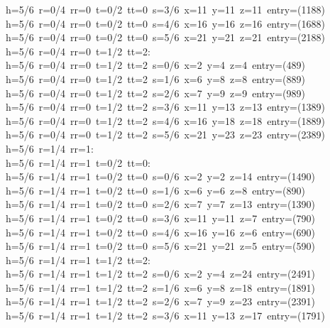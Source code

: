 \begin{tabbing}
h=5/6\ r=0/4\ rr=0\ t=0/2\ tt=0\ s=3/6\ x=11\ y=11\ z=11\ entry=(1188)\\[0pt]
h=5/6\ r=0/4\ rr=0\ t=0/2\ tt=0\ s=4/6\ x=16\ y=16\ z=16\ entry=(1688)\\[0pt]
h=5/6\ r=0/4\ rr=0\ t=0/2\ tt=0\ s=5/6\ x=21\ y=21\ z=21\ entry=(2188)\\[0pt]
h=5/6\ r=0/4\ rr=0\ t=1/2\ tt=2:\\[0pt]
h=5/6\ r=0/4\ rr=0\ t=1/2\ tt=2\ s=0/6\ x=2\ y=4\ z=4\ entry=(489)\\[0pt]
h=5/6\ r=0/4\ rr=0\ t=1/2\ tt=2\ s=1/6\ x=6\ y=8\ z=8\ entry=(889)\\[0pt]
h=5/6\ r=0/4\ rr=0\ t=1/2\ tt=2\ s=2/6\ x=7\ y=9\ z=9\ entry=(989)\\[0pt]
h=5/6\ r=0/4\ rr=0\ t=1/2\ tt=2\ s=3/6\ x=11\ y=13\ z=13\ entry=(1389)\\[0pt]
h=5/6\ r=0/4\ rr=0\ t=1/2\ tt=2\ s=4/6\ x=16\ y=18\ z=18\ entry=(1889)\\[0pt]
h=5/6\ r=0/4\ rr=0\ t=1/2\ tt=2\ s=5/6\ x=21\ y=23\ z=23\ entry=(2389)\\[0pt]
h=5/6\ r=1/4\ rr=1:\\[0pt]
h=5/6\ r=1/4\ rr=1\ t=0/2\ tt=0:\\[0pt]
h=5/6\ r=1/4\ rr=1\ t=0/2\ tt=0\ s=0/6\ x=2\ y=2\ z=14\ entry=(1490)\\[0pt]
h=5/6\ r=1/4\ rr=1\ t=0/2\ tt=0\ s=1/6\ x=6\ y=6\ z=8\ entry=(890)\\[0pt]
h=5/6\ r=1/4\ rr=1\ t=0/2\ tt=0\ s=2/6\ x=7\ y=7\ z=13\ entry=(1390)\\[0pt]
h=5/6\ r=1/4\ rr=1\ t=0/2\ tt=0\ s=3/6\ x=11\ y=11\ z=7\ entry=(790)\\[0pt]
h=5/6\ r=1/4\ rr=1\ t=0/2\ tt=0\ s=4/6\ x=16\ y=16\ z=6\ entry=(690)\\[0pt]
h=5/6\ r=1/4\ rr=1\ t=0/2\ tt=0\ s=5/6\ x=21\ y=21\ z=5\ entry=(590)\\[0pt]
h=5/6\ r=1/4\ rr=1\ t=1/2\ tt=2:\\[0pt]
h=5/6\ r=1/4\ rr=1\ t=1/2\ tt=2\ s=0/6\ x=2\ y=4\ z=24\ entry=(2491)\\[0pt]
h=5/6\ r=1/4\ rr=1\ t=1/2\ tt=2\ s=1/6\ x=6\ y=8\ z=18\ entry=(1891)\\[0pt]
h=5/6\ r=1/4\ rr=1\ t=1/2\ tt=2\ s=2/6\ x=7\ y=9\ z=23\ entry=(2391)\\[0pt]
h=5/6\ r=1/4\ rr=1\ t=1/2\ tt=2\ s=3/6\ x=11\ y=13\ z=17\ entry=(1791)\\[0pt]

\end{tabbing}
